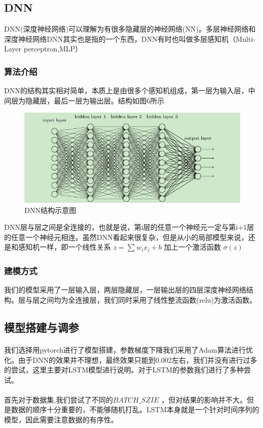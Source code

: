 \documentclass[UTF8]{ctexart}
\begin{document}
\subsection{DNN}
DNN(深度神经网络)可以理解为有很多隐藏层的神经网络(NN)。多层神经网络和深度神经网络DNN其实也是指的一个东西，DNN有时也叫做多层感知机（Multi-Layer perceptron,MLP）
\subsubsection{算法介绍}
DNN的结构其实相对简单，本质上是由很多个感知机组成，第一层为输入层，中间层为隐藏层，最后一层为输出层。结构如图6所示
\begin{figure}[!htbp]
    \centering
    \includegraphics[scale = 0.5]{p10.jpg}
    \caption{DNN结构示意图}
\end{figure}
DNN层与层之间是全连接的，也就是说，第i层的任意一个神经元一定与第i+1层的任意一个神经元相连。虽然DNN看起来很复杂，但是从小的局部模型来说，还是和感知机一样，即一个线性关系 $z = \sum_{}^{}{w_{i} x_{i}}+b$ 加上一个激活函数 $\sigma(z)$

\subsubsection{建模方式}
我们的模型采用了一层输入层，两层隐藏层，一层输出层的四层深度神经网络结构。层与层之间均为全连接层，我们同时采用了线性整流函数(relu)为激活函数。
\subsection{模型搭建与调参}
\paragraph{}我们选择用pytorch进行了模型搭建，参数梯度下降我们采用了Adam算法进行优化。由于DNN的效果并不理想，最终效果只能到0.002左右，我们并没有进行过多的尝试，这里主要对LSTM模型进行说明。对于LSTM的参数我们进行了多种尝试。
\paragraph{}首先对于数据集,我们尝试了不同的$BATCH\_SZIE$ ，但对结果的影响并不大。但是数据的顺序十分重要的，不能够随机打乱。LSTM本身就是一个针对时间序列的模型，因此需要注意数据的有序性。
\end{document}
